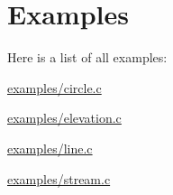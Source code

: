 \section{Examples}
Here is a list of all examples\-:\begin{DoxyCompactItemize}
\item 
\hyperlink{examples_2circle_8c-example}{examples/circle.\-c}
\item 
\hyperlink{examples_2elevation_8c-example}{examples/elevation.\-c}
\item 
\hyperlink{examples_2line_8c-example}{examples/line.\-c}
\item 
\hyperlink{examples_2stream_8c-example}{examples/stream.\-c}
\end{DoxyCompactItemize}
